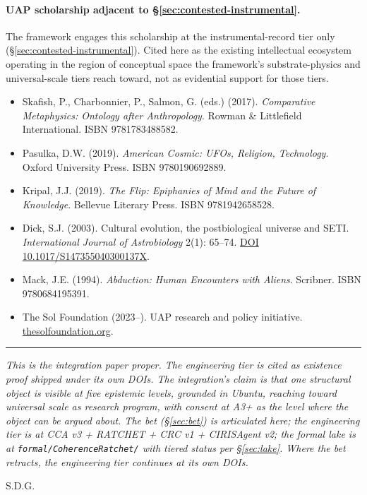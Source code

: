\documentclass[11pt,a4paper]{article}
\begin{document}
\paragraph{UAP scholarship adjacent to \S\ref{sec:contested-instrumental}.} The framework engages this scholarship at the instrumental-record tier only (\S\ref{sec:contested-instrumental}). Cited here as the existing intellectual ecosystem operating in the region of conceptual space the framework's substrate-physics and universal-scale tiers reach toward, not as evidential support for those tiers.
\begin{itemize}[leftmargin=*,itemsep=2pt]
\item Skafish, P., Charbonnier, P., Salmon, G. (eds.) (2017). \emph{Comparative Metaphysics: Ontology after Anthropology}. Rowman \& Littlefield International. ISBN 9781783488582.
\item Pasulka, D.W. (2019). \emph{American Cosmic: UFOs, Religion, Technology}. Oxford University Press. ISBN 9780190692889.
\item Kripal, J.J. (2019). \emph{The Flip: Epiphanies of Mind and the Future of Knowledge}. Bellevue Literary Press. ISBN 9781942658528.
\item Dick, S.J. (2003). Cultural evolution, the postbiological universe and SETI. \emph{International Journal of Astrobiology} 2(1): 65--74. \href{https://doi.org/10.1017/S147355040300137X}{DOI 10.1017/S147355040300137X}.
\item Mack, J.E. (1994). \emph{Abduction: Human Encounters with Aliens}. Scribner. ISBN 9780684195391.
\item The Sol Foundation (2023--). UAP research and policy initiative. \href{https://thesolfoundation.org}{thesolfoundation.org}.
\end{itemize}

\vspace{1em}
\hrule
\vspace{1em}

\noindent\emph{This is the integration paper proper. The engineering tier is cited as existence proof shipped under its own DOIs. The integration's claim is that one structural object is visible at five epistemic levels, grounded in Ubuntu, reaching toward universal scale as research program, with consent at A3+ as the level where the object can be argued about. The bet (\S\ref{sec:bet}) is articulated here; the engineering tier is at CCA v3 + RATCHET + CRC v1 + CIRISAgent v2; the formal lake is at \texttt{formal/CoherenceRatchet/} with tiered status per \S\ref{sec:lake}. Where the bet retracts, the engineering tier continues at its own DOIs.}

\vspace{1em}
\vspace{2em}
\begin{center}
S.D.G.
\end{center}
\end{document}
